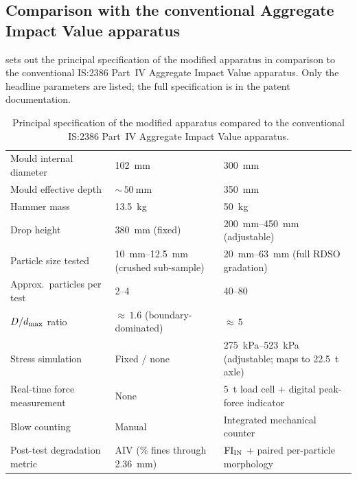 \subsection{Comparison with the conventional Aggregate Impact Value apparatus}
\label{sec:aiv-comparison}

 sets out the principal specification of the modified apparatus in comparison to the conventional IS:2386 Part~IV Aggregate Impact Value apparatus. Only the headline parameters are listed; the full specification is in the patent documentation.

\begin{table}[htbp]
  \centering
  \caption[Modified apparatus versus the conventional AIV apparatus]{Principal specification of the modified apparatus compared to the conventional IS:2386 Part~IV Aggregate Impact Value apparatus.}
  \label{tab:apparatus-comparison}
  \small
  \renewcommand{\arraystretch}{1.3}
  \begin{tabularx}{\textwidth}{@{}>{\raggedright\arraybackslash}p{} L L@{}}
    \toprule
     &  & \\
    \midrule
    Mould internal diameter   & \qty{102}{\mm} & \qty{300}{\mm}\\
    Mould effective depth     & ${\sim}\,\qty{50}{\mm}$ & \qty{350}{\mm}\\
    Hammer mass               & \qty{13.5}{\kg} & \qty{50}{\kg}\\
    Drop height               & \qty{380}{\mm} (fixed) & \qtyrange{200}{450}{\mm} (adjustable)\\
    Particle size tested      & \qtyrange{10}{12.5}{\mm} (crushed sub-sample) & \qtyrange{20}{63}{\mm} (full RDSO gradation)\\
    Approx.\ particles per test & 2--4 & 40--80\\
    $D/d_{\max}$ ratio            & ${\approx}\,1.6$ (boundary-dominated) & ${\approx}\,5$\\
    Stress simulation         & Fixed / none & \qtyrange{275}{523}{\kPa} (adjustable; maps to \qty{22.5}{\tonne} axle)\\
    Real-time force measurement & None & \qty{5}{\tonne} load cell + digital peak-force indicator\\
    Blow counting             & Manual & Integrated mechanical counter\\
    Post-test degradation metric & AIV (\% fines through \qty{2.36}{\mm}) & $\mathrm{FI}_{\mathrm{IN}}$ + paired per-particle morphology\\
    \bottomrule
  \end{tabularx}
\end{table}

